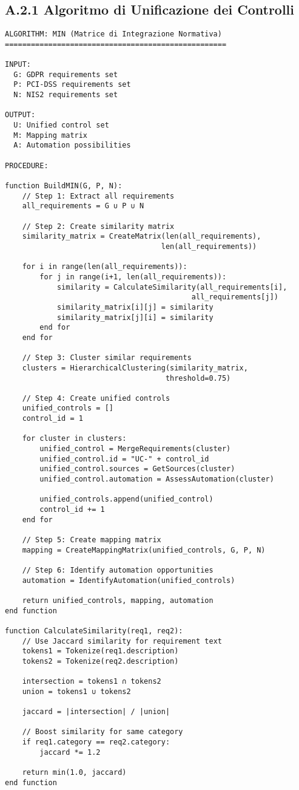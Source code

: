 \subsection{A.2.1 Algoritmo di Unificazione dei Controlli}

\begin{verbatim}
ALGORITHM: MIN (Matrice di Integrazione Normativa)
===================================================

INPUT:
  G: GDPR requirements set
  P: PCI-DSS requirements set
  N: NIS2 requirements set
  
OUTPUT:
  U: Unified control set
  M: Mapping matrix
  A: Automation possibilities

PROCEDURE:

function BuildMIN(G, P, N):
    // Step 1: Extract all requirements
    all_requirements = G ∪ P ∪ N
    
    // Step 2: Create similarity matrix
    similarity_matrix = CreateMatrix(len(all_requirements), 
                                    len(all_requirements))
    
    for i in range(len(all_requirements)):
        for j in range(i+1, len(all_requirements)):
            similarity = CalculateSimilarity(all_requirements[i], 
                                           all_requirements[j])
            similarity_matrix[i][j] = similarity
            similarity_matrix[j][i] = similarity
        end for
    end for
    
    // Step 3: Cluster similar requirements
    clusters = HierarchicalClustering(similarity_matrix, 
                                     threshold=0.75)
    
    // Step 4: Create unified controls
    unified_controls = []
    control_id = 1
    
    for cluster in clusters:
        unified_control = MergeRequirements(cluster)
        unified_control.id = "UC-" + control_id
        unified_control.sources = GetSources(cluster)
        unified_control.automation = AssessAutomation(cluster)
        
        unified_controls.append(unified_control)
        control_id += 1
    end for
    
    // Step 5: Create mapping matrix
    mapping = CreateMappingMatrix(unified_controls, G, P, N)
    
    // Step 6: Identify automation opportunities
    automation = IdentifyAutomation(unified_controls)
    
    return unified_controls, mapping, automation
end function

function CalculateSimilarity(req1, req2):
    // Use Jaccard similarity for requirement text
    tokens1 = Tokenize(req1.description)
    tokens2 = Tokenize(req2.description)
    
    intersection = tokens1 ∩ tokens2
    union = tokens1 ∪ tokens2
    
    jaccard = |intersection| / |union|
    
    // Boost similarity for same category
    if req1.category == req2.category:
        jaccard *= 1.2
    
    return min(1.0, jaccard)
end function
\end{verbatim}

